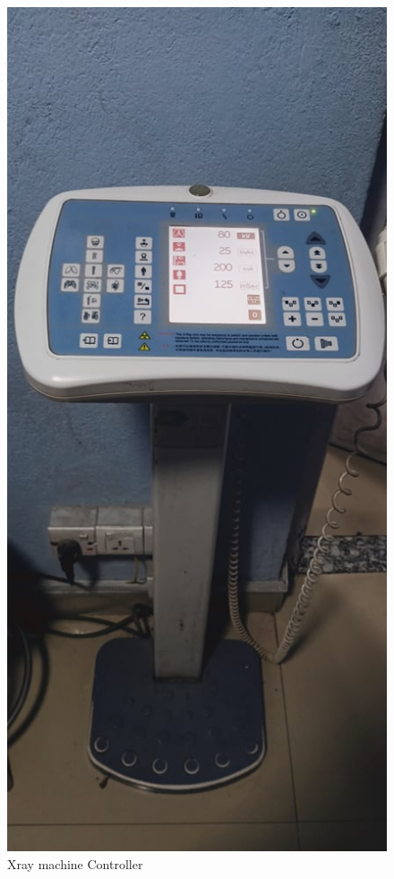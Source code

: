 \documentclass[a4paper,12pt]{report}
\begin{document}
  \begin{figure}[h] %
   \begin{center}
   \includegraphics[scale=0.2]{xray2.jpg}
   \caption{Xray machine Controller}
  \end{center}
  \end{figure}
  \pagebreak
\end{document}
